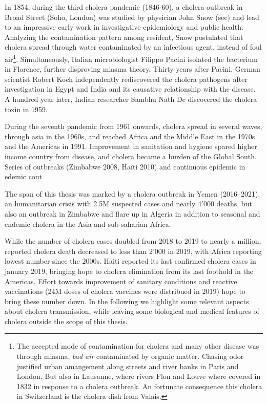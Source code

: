   In 1854, during the third cholera pandemic (1846-60), a cholera outbreak in Broad Street (Soho, London) was studied by physician John Snow (see\textcite{Snow:ModeCommunicationCholera:1855}) and lead to an impressive early work in investigative epidemiology and public health. Analyzing the contamination pattern among resident, Snow postulated that cholera spread through water contaminated by an infectious agent, instead of foul air\footnote{The accepted mode of contamination for cholera and many other disease was through miasma, \textit{bad air} contaminated by organic matter. Chasing odor  justified urban amangement along streets and river banks in Paris and London. But also in Lausanne, where rivers Flon and Louve where covered in 1832 in response to a cholera outbreak. An fortunate consequence this cholera in Switzerland is the cholera dish from Valais.}.  Simultaneously, Italian microbiologist Filippo Pacini isolated the bacterium in Florence, further disproving miasma theory. Thirty years after Pacini, German scientist Robert Koch independently rediscovered the cholera pathogens after investigation in Egypt and India and its causative relationship with the disease. A hundred year later, Indian researcher Sambhu Nath De discovered the cholera toxin in 1959.

During the seventh pandemic from 1961 onwards, cholera spread in several waves, through asia in the 1960s, and reached Africa and the Middle East in the 1970s and the Americas in 1991\cite{Mutreja:EvidenceSeveralWaves:2011}. Improvement in sanitation and hygiene spared higher income country from disease, and cholera became a burden of the Global South. Series of outbreaks (\eg Zimbabwe 2008, Haïti 2010) and continuous epidemic in edemic cout

The span of this thesis was marked by a cholera outbreak in Yemen (2016--2021), an humanitarian crisis with 2.5M suspected cases and nearly 4'000 deaths, but also an outbreak in Zimbabwe and flare up in Algeria in addition to seasonal and  endemic cholera in the Asia and sub-saharian Africa.

While the number of cholera cases doubled from 2018 to 2019 to nearly a million, reported cholera death decreased to less than 2'000 in 2019, with Africa reporting lowest number since the 2000s. Haiti reported its last confirmed cholera cases in january 2019, bringing hope to cholera elimination from its last foothold in the Americas. Effort towards improvement of sanitary conditions and reactive vaccinations (24M doses of cholera vaccines were distribued in 2019) hope to bring these number down\cite{WHO:Cholera2019:2020}. 
In the following we highlight some relevant aspects about cholera transmission, while leaving some biological and medical features of cholera outside the scope of this thesis.


